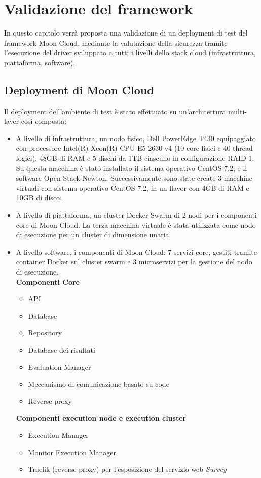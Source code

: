 \documentclass[../main.tex]{subfiles}
\begin{document}
\chapter{Validazione del framework}
In questo capitolo verrà proposta una validazione di un deployment di test del framework Moon Cloud, mediante la valutazione della sicurezza tramite l'esecuzione del driver sviluppato a tutti i livelli dello stack cloud (infrastruttura, piattaforma, software). 

\section{Deployment di Moon Cloud}

Il deployment dell'ambiente di test è stato effettuato su un'architettura multi-layer così composta:
\begin{itemize}
    \item A livello di infrastruttura, un nodo fisico, Dell PowerEdge T430 equipaggiato con processore Intel(R) Xeon(R) CPU E5-2630 v4 (10 core fisici e 40 thread logici), 48GB di RAM e 5 dischi da 1TB ciascuno in configurazione RAID 1. Su questa macchina è stato installato il sistema operativo CentOS 7.2, e il software Open Stack Newton.
        Successivamente sono state create 3 macchine virtuali con sistema operativo CentOS 7.2, in un flavor con 4GB di RAM e 10GB di disco.
    \item A livello di piattaforma, un cluster Docker Swarm di 2 nodi per i componenti core di Moon Cloud. La terza macchina virtuale è stata utilizzata come nodo di esecuzione per un cluster di dimensione unaria.
    \item A livello software, i componenti di Moon Cloud: 7 servizi core, gestiti tramite container Docker sul cluster swarm e 3 microservizi per la gestione del nodo di esecuzione.\\
        \textbf{Componenti Core}
        \begin{itemize}
            \item API
            \item Database
            \item Repository
            \item Database dei risultati
            \item Evaluation Manager
            \item Meccanismo di comunicazione basato su code
            \item Reverse proxy
        \end{itemize}
        \textbf{Componenti execution node e execution cluster}
        \begin{itemize}
            \item Execution Manager
            \item Monitor Execution Manager
            \item Traefik (reverse proxy) per l'esposizione del servizio web \textit{Survey}
        \end{itemize}
\end{itemize}
\end{document}
